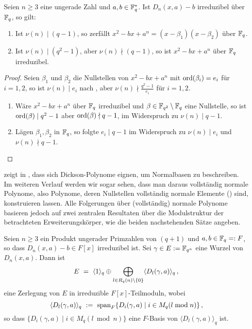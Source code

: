 \begin{kor}
  \label{kor:dickson_quadr}
  Seien $n\geq 3$ eine ungerade Zahl und $a,b \in \mathbb{F}_q^\ast$. Ist $D_n(x,a)-b$
  irreduzibel über $\mathbb{F}_q$, so gilt:
  \begin{enumerate}
    \item Ist $\nu(n) \mid (q-1)$, so zerfällt
      $x^2-bx+a^n = (x-\beta_1)(x-\beta_2)$ über $\mathbb{F}_q$.
    \item Ist $\nu(n) \mid (q^2-1)$, aber $\nu(n)\nmid (q-1)$, so ist
      $x^2-bx+a^n$ über $\mathbb{F}_q$ irreduzibel.
  \end{enumerate}
\end{kor}
\begin{proof}
  Seien $\beta_1$ und $\beta_2$ die Nullstellen von $x^2-bx+a^n$ mit 
  $\operatorname{ord}(\beta_i) = e_i$ für $i=1,2$, so ist $\nu(n) \mid e_i$ nach 
  , aber $\nu(n)\nmid \frac{q^2-1}{e_i}$ für $i=1,2$.
  \begin{enumerate}
    \item Wäre $x^2-bx+a^n$ über $\mathbb{F}_q$ irreduzibel und
      $\beta \in \mathbb{F}_{q^2}\setminus\mathbb{F}_q$ eine Nullstelle, so
      ist $\operatorname{ord}(\beta) \mid q^2-1$ aber $\operatorname{ord}(\beta) \nmid q-1$,
      im Widerspruch zu $\nu(n)\mid q-1$.
    \item Lägen $\beta_1,\beta_2$ in $\mathbb{F}_q$, so folgte $e_i \mid q-1$ im
      Widerspruch zu $\nu(n)\mid e_i$ und $\nu(n)\nmid q-1$.
  \end{enumerate}
\end{proof}


\citeauthor{scheerhorn:1996} zeigt in
\autocites{scheerhorn:1996}{scheerhorn:1997}, dass sich Dickson-Polynome
eignen, um Normalbasen zu beschreiben. Im weiteren Verlauf werden wir sogar
sehen, dass man daraus vollständig normale Polynome, also Polynome, deren
Nullstellen vollständig normale Elemente () sind,
konstruieren lassen. Alle Folgerungen über (vollständig) normale Polynome
basieren jedoch auf zwei zentralen Resultaten über die Modulstruktur der
betrachteten Erweiterungskörper, wie die beiden nachstehenden Sätze angeben.

\begin{satz}
  \label{satz:scheerhorn1}
  Seien $n\geq 3$ ein Produkt ungerader Primzahlen von $(q+1)$ und 
  $a,b\in \mathbb{F}_q =: F$, so dass $D_n(x,a)-b \in F[x]$ irreduzibel ist.
  Sei $\gamma \in E := \mathbb{F}_{q^n}$ eine Wurzel von $D_n(x,a)$. Dann ist
  \[ E \ =\  \langle 1\rangle_q \oplus 
    \bigoplus_{l\in R_q(n)\setminus \{0\}} \langle D_l(\gamma,a)\rangle_q\,,\]
  eine Zerlegung von $E$ in irreduzible $F[x]$-Teilmoduln, wobei
  \[ \langle D_l(\gamma,a)\rangle_q \ :=\ 
    \operatorname{span}_F\{ D_i(\gamma,a) \mid i\in M_q(l\bmod n)\} \,,\]
  so dass $\{ D_i(\gamma,a) \mid i\in M_q(l\bmod n)\}$ eine $F$-Basis von
  $\langle D_l(\gamma,a)\rangle_q$ ist.
\end{satz}

